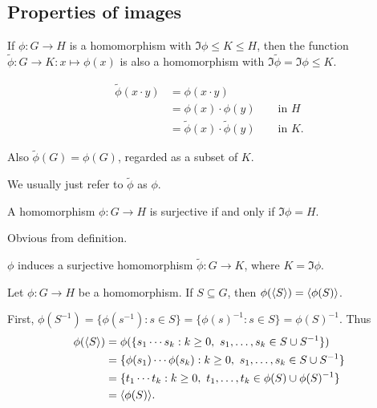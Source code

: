 \documentclass[12pt,letterpaper]{report}
\begin{document}
\pagebreak
\subsection{Properties of images}

\begin{lem}{}{}
  If $\phi \colon G \to H$ is a homomorphism with $\Im \phi \leq K \leq H$, then the function
  $\tilde{\phi} \colon G \to K : x \mapsto \phi(x)$ is also a homomorphism with
  $\Im \tilde{\phi} = \Im \phi \leq K$.
\end{lem}

\begin{thmproof}
  \begin{align*}
    \tilde{\phi}(x \cdot y) &= \phi(x \cdot y) \\
    &= \phi(x) \cdot \phi(y) \qquad \text{in } H \\
    &= \tilde{\phi}(x) \cdot \tilde{\phi}(y) \qquad \text{in } K.
  \end{align*}

  Also $\tilde{\phi}(G) = \phi(G)$, regarded as a subset of $K$.
\end{thmproof}

We usually just refer to $\tilde{\phi}$ as $\phi$.

\begin{lem}{}{}
  A homomorphism $\phi \colon G \to H$ is surjective if and only if $\Im \phi = H$.
\end{lem}

\begin{thmproof}
  Obvious from definition.
\end{thmproof}

\begin{cor}{}{}
  $\phi$ induces a surjective homomorphism $\tilde{\phi} \colon G \to K$, where $K = \Im \phi$.
\end{cor}

\begin{prop}{}{}
  Let $\phi \colon G \to H$ be a homomorphism.
  If $S \subseteq G$, then $\phi(\langle S\rangle) = \langle\phi(S)\rangle$.
\end{prop}

\begin{thmproof}
  First, $\phi(S^{-1}) = \{\phi(s^{-1}) : s \in S\} = \{\phi(s)^{-1} : s \in S\} = \phi(S)^{-1}$.
  Thus
  \begin{align*}
    \phi(\langle S\rangle)
    &= \phi(\{ s_1 \cdots s_k : k \geq 0, \ s_1, \ldots, s_k \in S \cup S^{-1} \}) \\
    &= \{ \phi(s_1) \cdots \phi(s_k) : k \geq 0, \ s_1, \ldots, s_k \in S \cup S^{-1} \} \\
    &= \{ t_1 \cdots t_k : k \geq 0, \ t_1, \ldots, t_k \in \phi(S) \cup \phi(S)^{-1} \} \\
    &= \langle\phi(S)\rangle.
  \end{align*}
\end{thmproof}
\end{document}
